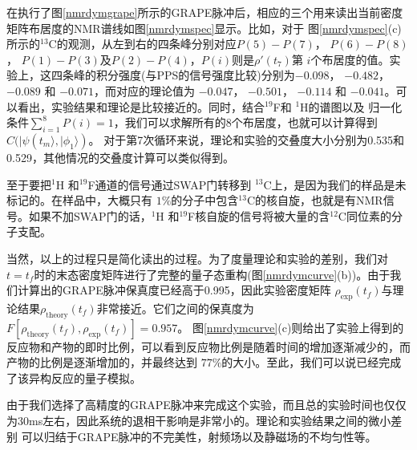  在执行了图\ref{nmrdymgrape}所示的GRAPE脉冲后，相应的三个用来读出当前密度矩阵布居度的NMR谱线如图\ref{nmrdymspec}显示。比如，对于
 图\ref{nmrdymspec}(c)所示的$^{13}$C的观测，从左到右的四条峰分别对应$P(5)-P(7)$， $P(6)-P(8)$， $P(1)-P(3)$及$P(2)-P(4)$，$P(i)$则是$\rho'(t_7)$第
 $i$个布居度的值。实验上，这四条峰的积分强度(与PPS的信号强度比较)分别为$-0.098$， $-0.482$， $-0.089$ 和 $-0.071$，而对应的理论值为
 $-0.047$， $-0.501$， $-0.114$ 和 $-0.041$。可以看出，实验结果和理论是比较接近的。同时，结合$^{19}$F和 $^1$H的谱图以及
 归一化条件$\sum_{i=1}^{8} {P}({i})=1$，我们可以求解所有的8个布居度，也就可以计算得到$C(| \psi(t_{m} \rangle,| \phi_{1} \rangle)$。
 对于第7次循环来说，理论和实验的交叠度大小分别为0.535和0.529，其他情况的交叠度计算可以类似得到。

 至于要把${}^{1}$H 和${}^{19}$F通道的信号通过SWAP门转移到 $^{13}$C上，是因为我们的样品是未标记的。在样品中，大概只有
 $1\%$的分子中包含$^{13}$C的核自旋，也就是有NMR信号。如果不加SWAP门的话，${}^{1}$H 和${}^{19}$F核自旋的信号将被大量的含${}^{12}$C同位素的分子支配。

 当然，以上的过程只是简化读出的过程。为了度量理论和实验的差别，我们对$t=t_f$时的末态密度矩阵进行了完整的量子态重构(图\ref{nmrdymcurve}(b))。由于我们计算出的GRAPE脉冲保真度已经高于0.995，因此实验密度矩阵
 $\rho_{\text{exp}}(t_f)$与理论结果$\rho_{\text{theory}}(t_f)$非常接近。它们之间的保真度为$F[\rho_{\text{theory}}(t_f),\rho_{\text{exp}}(t_f)]=0.957$。
 图\ref{nmrdymcurve}(c)则给出了实验上得到的反应物和产物的即时比例，可以看到反应物比例是随着时间的增加逐渐减少的，而产物的比例是逐渐增加的，并最终达到
 $77\%$的大小。至此，我们可以说已经完成了该异构反应的量子模拟。

 由于我们选择了高精度的GRAPE脉冲来完成这个实验，而且总的实验时间也仅仅为30ms左右，因此系统的退相干影响是非常小的。理论和实验结果之间的微小差别
 可以归结于GRAPE脉冲的不完美性，射频场以及静磁场的不均匀性等。


